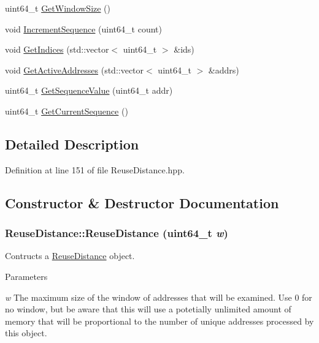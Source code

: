 \begin{DoxyCompactItemize}
\item 
uint64\_\-t \hyperlink{class_reuse_distance_a174706aa3697f068cc4d1534948d7786}{GetWindowSize} ()
\item 
void \hyperlink{class_reuse_distance_a0c6e2709575d716c1ac659a266164163}{IncrementSequence} (uint64\_\-t count)
\item 
void \hyperlink{class_reuse_distance_a99fb4b3aae663676515ad354691b7cc6}{GetIndices} (std::vector$<$ uint64\_\-t $>$ \&ids)
\item 
void \hyperlink{class_reuse_distance_acc4885040a8a518fc10b5aa4da7d777a}{GetActiveAddresses} (std::vector$<$ uint64\_\-t $>$ \&addrs)
\item 
uint64\_\-t \hyperlink{class_reuse_distance_ac849305d7ca15a5099956d0a89c929a7}{GetSequenceValue} (uint64\_\-t addr)
\item 
uint64\_\-t \hyperlink{class_reuse_distance_a5e88535f0b223c0e6d6ab1f4a1aa29ba}{GetCurrentSequence} ()
\end{DoxyCompactItemize}


\subsection{Detailed Description}


Definition at line 151 of file ReuseDistance.hpp.



\subsection{Constructor \& Destructor Documentation}
\hypertarget{class_reuse_distance_ab68a2d9df5c28571c3f8820c5344b2c1}{
\subsubsection[{ReuseDistance}]{\setlength{\rightskip}{0pt plus 5cm}ReuseDistance::ReuseDistance (uint64\_\-t {\em w})}}
\label{class_reuse_distance_ab68a2d9df5c28571c3f8820c5344b2c1}
Contructs a \hyperlink{class_reuse_distance}{ReuseDistance} object.


\begin{DoxyParams}{Parameters}
\item[{\em w}]The maximum size of the window of addresses that will be examined. Use 0 for no window, but be aware that this will use a potetially unlimited amount of memory that will be proportional to the number of unique addresses processed by this object. \end{DoxyParams}


